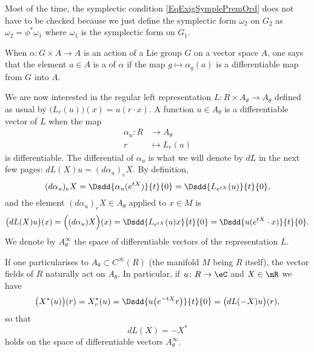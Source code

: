 \begin{remark}
Most of the time, the symplectic condition \eqref{EqExigSymplePremOrd} does not have to be checked because we just define the symplectic form $\omega_2$ on $G_2$ as $\omega_2=\phi^*\omega_1$ where $\omega_1$ is the symplectic form on $G_1$.
\end{remark}

\begin{definition}
When $\alpha\colon G\times A\to A$ is an action of a Lie group $G$ on a vector space $A$, one says that the element $a\in A$ is a  of $\alpha$ if the map $g\mapsto\alpha_g(a)$ is a differentiable map from $G$ into $A$.
\end{definition}

We are now interested in the regular left representation $L\colon R\times A_{\theta}\to  A_{\theta}$ defined as usual by $\big( L_r(u) \big)(x)=u(r\cdot x)$. A function $u\in A_{\theta}$ is a differentiable vector of $L$ when the map 
\begin{equation}
\begin{aligned}
 \alpha_u\colon R&\to  A_{\theta} \\ 
r&\mapsto L_r(u) 
\end{aligned}
\end{equation}
is differentiable. The differential of $\alpha_u$ is what we will denote by $dL$ in the next few pages: $dL(X)u=(d\alpha_u)_eX$. By definition, 
\[ 
  (d\alpha_u)_eX=\Dsdd{ \alpha_u( e^{tX}) }{t}{0}=\Dsdd{ L_{ e^{tX}}(u) }{t}{0},
\]
and the element $(d\alpha_u)_eX\in A_{\theta}$ applied to $x\in M$ is
\begin{equation}
 \big( dL(X)u \big)(x) =\Big( (d\alpha_u)X \Big)(x)=\Dsdd{ L_{ e^{tX}}(u)x }{t}{0}=\Dsdd{ u( e^{tX}\cdot x) }{t}{0}.
\end{equation}
We denote by $ A_{\theta}^{\infty}$ the space of differentiable vectors of the representation $L$.

If one particularises to  $ A_{\theta}\subset  C^{\infty}(R)$ (the manifold $M$ being $R$ itself), the vector fields of $R$ naturally act on $ A_{\theta}$. In particular, if $u\colon R\to \eC$ and $X\in \mR$ we have
\[ 
  \big( X^*(u) \big)(r)=X^*_r(u)=\Dsdd{ u\big(  e^{-tX}r \big) }{t}{0}=\big( dL(-X)u \big)(r), 
\]
so that
\begin{equation}
   dL(X)=-X^*
\end{equation}
holds on the space of differentiable vectors $ A_{\theta}^{\infty}$.

